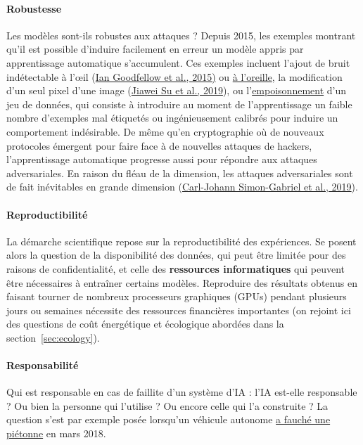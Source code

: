 \paragraph{Robustesse} Les modèles sont-ils robustes aux attaques ? Depuis
2015, les exemples montrant qu'il est possible d'induire facilement en erreur
un modèle appris par apprentissage automatique s'accumulent. Ces exemples
incluent l'ajout de bruit indétectable à
  l'\oe{}il (\href{https://arxiv.org/abs/1412.6572}{Ian Goodfellow et al., 2015)} ou
\href{https://nicholas.carlini.com/code/audio\_adversarial\_examples}{à
  l'oreille}, la modification d'un seul
  pixel d'une image (\href{https://ieeexplore.ieee.org/document/8601309}{Jiawei Su et al., 2019}), ou
l'\href{https://www.ibm.com/fr-fr/think/topics/data-poisoning}{empoisonnement}
d'un jeu de données, qui consiste à introduire au moment de
l'ap\-pren\-tis\-sage un faible nombre d'exemples mal étiquetés ou
ingénieusement calibrés pour induire un comportement indésirable.  De même
qu'en cry\-pto\-gra\-phie où de nouveaux protocoles émergent pour faire face à de
nouvelles attaques de hackers, l'apprentissage automatique progresse aussi pour
répondre aux attaques adversariales. En raison du fléau de la dimension, les
attaques adversariales sont de fait
inévitables en
grande dimension (\href{http://proceedings.mlr.press/v97/simon-gabriel19a.html}{Carl-Johann Simon-Gabriel et al., 2019}).

\paragraph{Reproductibilité} La démarche scientifique repose sur la
reproductibilité des expériences. Se posent alors la question de la
disponibilité des données, qui peut être limitée pour des raisons de
confidentialité, et celle des \textbf{ressources informatiques} qui peuvent
être nécessaires à entraîner certains modèles. Re\-pro\-dui\-re des résultats
obtenus en faisant tourner de nombreux processeurs graphiques (GPUs) pendant
plusieurs jours ou semaines nécessite des ressources financières importantes
(on rejoint ici des questions de coût énergétique et écologique abordées dans
la section~\ref{sec:ecology}).

\paragraph{Responsabilité} Qui est responsable en cas de faillite d'un
système d'IA : l'IA est-elle responsable ? Ou bien la personne qui l'utilise ?
Ou encore celle qui l'a construite ? La question s'est par exemple posée
lorsqu'un véhicule autonome
\href{https://www.nextinpact.com/news/108432-cause-probable-accident-mortel-uber-tout-monde-en-prend-pour-son-grade.htm}{a
  fauché une piétonne} en mars 2018.


